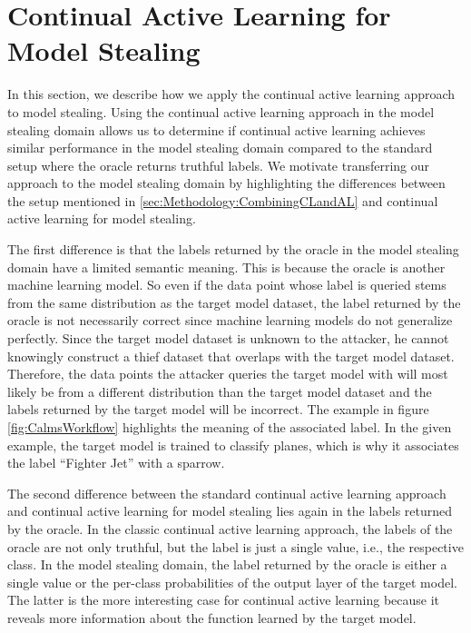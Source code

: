 \section{Continual Active Learning for Model Stealing}
\label{sec:Methodolody:CALMS}
In this section, we describe how we apply the continual active learning approach to model stealing. Using the continual active learning approach
in the model stealing domain allows us to determine if continual active learning achieves similar performance in the model stealing domain compared to
the standard setup where the oracle returns truthful labels. We motivate transferring our approach to the model stealing domain by highlighting the
 differences between the setup mentioned in \ref{sec:Methodology:CombiningCLandAL} and continual active learning for model stealing. \par
The first difference is that the labels returned by the oracle in the model stealing domain have a limited semantic meaning. This is because the oracle
 is another machine learning model. So even if the data point whose label is queried stems from the same distribution as the target model dataset,
the label returned by the oracle is not necessarily correct since machine learning models do not generalize perfectly. Since the target model dataset
is unknown to the attacker, he cannot knowingly construct a thief dataset that overlaps with the target model dataset. Therefore, the data points the
 attacker queries the target model with will most likely be from a different distribution than the target model dataset and the labels returned by the target model
will be incorrect. The example in figure \ref{fig:CalmsWorkflow} highlights the meaning of the associated label. In the given example, the target model 
is trained to classify planes, which is why it associates the label \enquote{Fighter Jet} with a sparrow. \par
The second difference between the standard continual active learning approach and continual active learning for model stealing lies again in the labels
returned by the oracle. In the classic continual active learning approach, the labels of the oracle are not only truthful, but the label is just a
single value, i.e., the respective class. In the model stealing domain, the label returned by the oracle is either a single value or the per-class
probabilities of the output layer of the target model. The latter is the more interesting case for continual active learning because it reveals more
information about the function learned by the target model. \par
